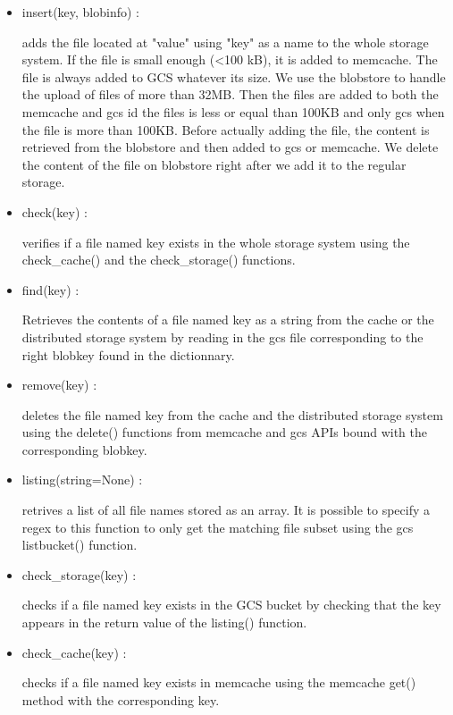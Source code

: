 \documentclass{article}
\begin{document}
\begin{itemize}

	\item insert(key, blobinfo) : 

	adds the file located at "value" using "key" as a name to the whole storage system. If the file is small enough (\textless100 kB), it is added to memcache. The file is always added to GCS whatever its size. We use the blobstore to handle the upload of files of more than 32MB. Then the files are added to both the memcache and gcs id the files is less or equal than 100KB and only gcs when the file is more than 100KB. Before actually adding the file, the content is retrieved from the blobstore and then added to gcs or memcache. We delete the content of the file on blobstore right after we add it to the regular storage.

	\item check(key) : 

	verifies if a file named key exists in the whole storage system using the check\_cache() and the check\_storage() functions.

	\item find(key) :

	Retrieves the contents of a file named key as a string from the cache or the distributed storage system by reading in the gcs file corresponding to the right blobkey found in the dictionnary.

	\item remove(key) :

	deletes the file named key from the cache and the distributed storage system using the delete() functions from memcache and gcs APIs bound with the corresponding blobkey.

	\item listing(string=None) :

	retrives a list of all file names stored as an array. It is possible to specify a regex to this function to only get the matching file subset using the gcs listbucket() function.

	\item check\_storage(key) :

	checks if a file named key exists in the GCS bucket by checking that the key appears in the return value of the listing() function.

	\item check\_cache(key) :

	checks if a file named key exists in memcache using the memcache get() method with the corresponding key. 


\end{itemize}
\end{document}
